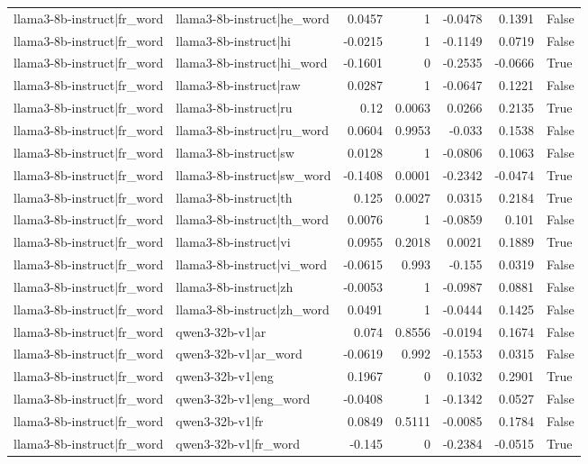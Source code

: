 \begin{table}
\begin{tabular}{l l r r r r l}
llama3-8b-instruct|fr_word & llama3-8b-instruct|he_word & 0.0457 & 1 & -0.0478 & 0.1391 & False \\
llama3-8b-instruct|fr_word & llama3-8b-instruct|hi & -0.0215 & 1 & -0.1149 & 0.0719 & False \\
llama3-8b-instruct|fr_word & llama3-8b-instruct|hi_word & -0.1601 & 0 & -0.2535 & -0.0666 & True \\
llama3-8b-instruct|fr_word & llama3-8b-instruct|raw & 0.0287 & 1 & -0.0647 & 0.1221 & False \\
llama3-8b-instruct|fr_word & llama3-8b-instruct|ru & 0.12 & 0.0063 & 0.0266 & 0.2135 & True \\
llama3-8b-instruct|fr_word & llama3-8b-instruct|ru_word & 0.0604 & 0.9953 & -0.033 & 0.1538 & False \\
llama3-8b-instruct|fr_word & llama3-8b-instruct|sw & 0.0128 & 1 & -0.0806 & 0.1063 & False \\
llama3-8b-instruct|fr_word & llama3-8b-instruct|sw_word & -0.1408 & 0.0001 & -0.2342 & -0.0474 & True \\
llama3-8b-instruct|fr_word & llama3-8b-instruct|th & 0.125 & 0.0027 & 0.0315 & 0.2184 & True \\
llama3-8b-instruct|fr_word & llama3-8b-instruct|th_word & 0.0076 & 1 & -0.0859 & 0.101 & False \\
llama3-8b-instruct|fr_word & llama3-8b-instruct|vi & 0.0955 & 0.2018 & 0.0021 & 0.1889 & True \\
llama3-8b-instruct|fr_word & llama3-8b-instruct|vi_word & -0.0615 & 0.993 & -0.155 & 0.0319 & False \\
llama3-8b-instruct|fr_word & llama3-8b-instruct|zh & -0.0053 & 1 & -0.0987 & 0.0881 & False \\
llama3-8b-instruct|fr_word & llama3-8b-instruct|zh_word & 0.0491 & 1 & -0.0444 & 0.1425 & False \\
llama3-8b-instruct|fr_word & qwen3-32b-v1|ar & 0.074 & 0.8556 & -0.0194 & 0.1674 & False \\
llama3-8b-instruct|fr_word & qwen3-32b-v1|ar_word & -0.0619 & 0.992 & -0.1553 & 0.0315 & False \\
llama3-8b-instruct|fr_word & qwen3-32b-v1|eng & 0.1967 & 0 & 0.1032 & 0.2901 & True \\
llama3-8b-instruct|fr_word & qwen3-32b-v1|eng_word & -0.0408 & 1 & -0.1342 & 0.0527 & False \\
llama3-8b-instruct|fr_word & qwen3-32b-v1|fr & 0.0849 & 0.5111 & -0.0085 & 0.1784 & False \\
llama3-8b-instruct|fr_word & qwen3-32b-v1|fr_word & -0.145 & 0 & -0.2384 & -0.0515 & True \\

\end{tabular}
\end{table}
